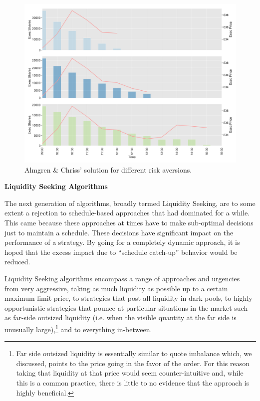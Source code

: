 	\begin{figure}[!ht]
	\centering
	\includegraphics[width=\textwidth]{chapters/chapter_exec_models/figures/is.png} 
	\caption{Almgren \& Chriss' solution for different risk aversions. \label{fig:is}}
	\end{figure}


\noindent\textbf{Liquidity Seeking Algorithms} \twomedskip

The next generation of algorithms, broadly termed Liquidity Seeking, are to some extent a rejection to schedule-based approaches that had dominated for a while. This came because these approaches at times have to make sub-optimal decisions just to maintain a schedule. These decisions have significant impact on the performance of a strategy. By going for a completely dynamic approach, it is hoped that the excess impact due to ``schedule catch-up'' behavior would be reduced.


Liquidity Seeking algorithms encompass a range of approaches and urgencies from very aggressive, taking as much liquidity as possible up to a certain maximum limit price, to strategies that post all liquidity in dark pools, to highly opportunistic strategies that pounce at particular situations in the market such as far-side outsized liquidity (i.e. when the visible quantity at the far side is unusually large),\footnote{Far side outsized liquidity is essentially similar to quote imbalance which, we discussed, points to the price going in the favor of the order. For this reason taking that liquidity at that price would seem counter-intuitive and, while this is a common practice,  there is little to no evidence that the approach is highly beneficial.} and to everything in-between.


